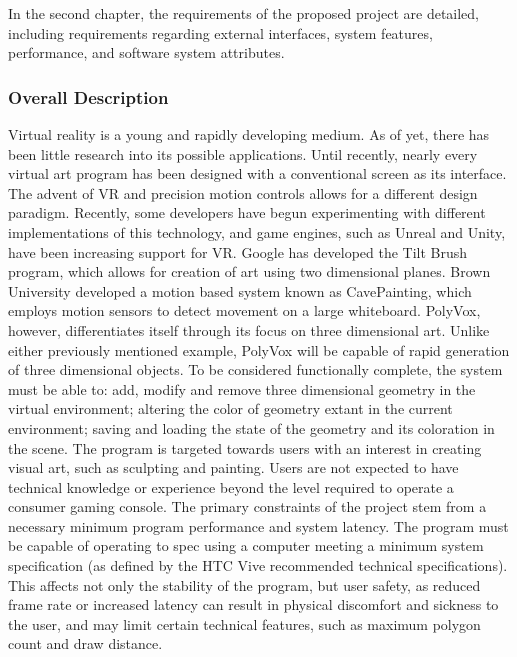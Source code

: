 \documentclass[onecolumn, draftclsnofoot,10pt, compsoc]{IEEEtran}
\newcounter{threesection}[subsubsection]
\begin{document}
In the second chapter, the requirements of the proposed project are detailed, including requirements regarding external interfaces, system features, performance, and software system attributes.
\subsubsection{Overall Description}
Virtual reality is a young and rapidly developing medium. As of yet, there has been little research into its possible applications.
Until recently, nearly every virtual art program has been designed with a conventional screen as its interface.
The advent of VR and precision motion controls allows for a different design paradigm.
Recently, some developers have begun experimenting with different implementations of this technology, and game engines, such as Unreal and Unity, have been increasing support for VR.\cite{unity}\cite{unreal} Google has developed the Tilt Brush program, which allows for creation of art using two dimensional planes.
Brown University developed a motion based system known as CavePainting, which employs motion sensors to detect movement on a large whiteboard.
PolyVox, however, differentiates itself through its focus on three dimensional art.
Unlike either previously mentioned example, PolyVox will be capable of rapid generation of three dimensional objects.\cite{cave}\cite{tilt}
To be considered functionally complete, the system must be able to: add, modify and remove three dimensional geometry in the virtual environment; altering the color of geometry extant in the current environment; saving and loading the state of the geometry and its coloration in the scene.
The program is targeted towards users with an interest in creating visual art, such as sculpting and painting.
Users are not expected to have technical knowledge or experience beyond the level required to operate a consumer gaming console.
The primary constraints of the project stem from a necessary minimum program performance and system latency.
The program must be capable of operating to spec using a computer meeting a minimum system specification (as defined by the HTC Vive recommended technical specifications).
This affects not only the stability of the program, but user safety, as reduced frame rate or increased latency can result in physical discomfort and sickness to the user, and may limit certain technical features, such as maximum polygon count and draw distance.
\end{document}
